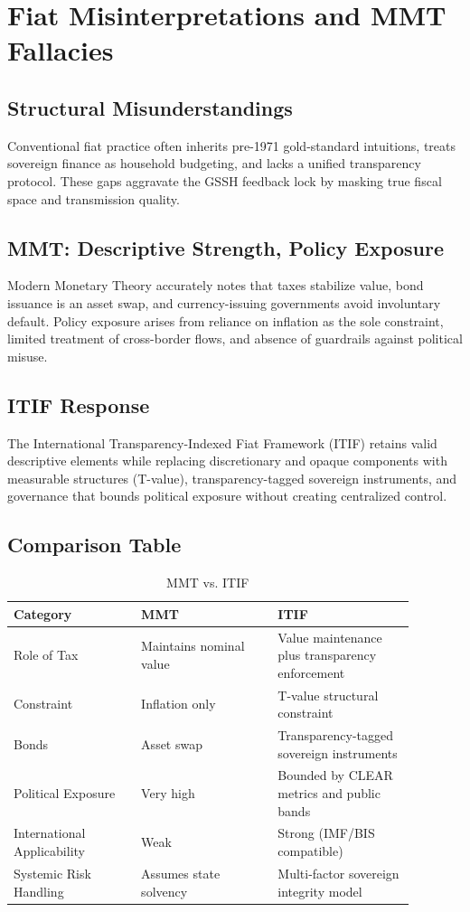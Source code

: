 \section{Fiat Misinterpretations and MMT Fallacies}
\subsection{Structural Misunderstandings}
Conventional fiat practice often inherits pre-1971 gold-standard intuitions, treats sovereign finance as household budgeting, and lacks a unified transparency protocol. These gaps aggravate the GSSH feedback lock by masking true fiscal space and transmission quality.

\subsection{MMT: Descriptive Strength, Policy Exposure}
Modern Monetary Theory accurately notes that taxes stabilize value, bond issuance is an asset swap, and currency-issuing governments avoid involuntary default. Policy exposure arises from reliance on inflation as the sole constraint, limited treatment of cross-border flows, and absence of guardrails against political misuse.

\subsection{ITIF Response}
The International Transparency-Indexed Fiat Framework (ITIF) retains valid descriptive elements while replacing discretionary and opaque components with measurable structures (T-value), transparency-tagged sovereign instruments, and governance that bounds political exposure without creating centralized control.

\subsection{Comparison Table}
\begin{table}[H]
  \centering
  \begin{tabular}{p{0.28\linewidth}p{0.3\linewidth}p{0.3\linewidth}}
    \toprule
    Category & MMT & ITIF \\
    \midrule
    Role of Tax & Maintains nominal value & Value maintenance plus transparency enforcement \\
    Constraint & Inflation only & T-value structural constraint \\
    Bonds & Asset swap & Transparency-tagged sovereign instruments \\
    Political Exposure & Very high & Bounded by CLEAR metrics and public bands \\
    International Applicability & Weak & Strong (IMF/BIS compatible) \\
    Systemic Risk Handling & Assumes state solvency & Multi-factor sovereign integrity model \\
    \bottomrule
  \end{tabular}
  \caption{MMT vs. ITIF}
\end{table}
